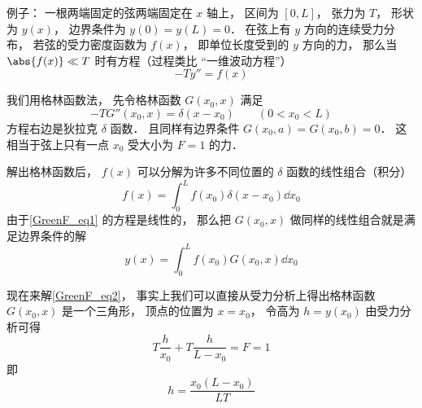 
\begin{issues}
\issueDraft
\end{issues}


例子： 一根两端固定的弦两端固定在 $x$ 轴上， 区间为 $[0, L]$， 张力为 $T$， 形状为 $y(x)$， 边界条件为 $y(0) = y(L) = 0$． 在弦上有 $y$ 方向的连续受力分布， 若弦的受力密度函数为 $f(x)$， 即单位长度受到的 $y$ 方向的力， 那么当 $\abs{f(x)} \ll T$ 时有方程（过程类比 “一维波动方程”）
\begin{equation}\label{GreenF_eq1}
-T y'' = f(x)
\end{equation}

我们用格林函数法， 先令格林函数 $G(x_0, x)$ 满足
\begin{equation}\label{GreenF_eq2}
-T G''(x_0, x) = \delta(x - x_0) \qquad (0 < x_0 < L)
\end{equation}
方程右边是狄拉克 $\delta$ 函数． 且同样有边界条件 $G(x_0, a) = G(x_0, b) = 0$． 这相当于弦上只有一点 $x_0$ 受大小为 $F = 1$ 的力．

解出格林函数后， $f(x)$ 可以分解为许多不同位置的 $\delta$ 函数的线性组合（积分）
\begin{equation}
f(x) = \int_0^L f(x_0) \delta(x - x_0) \dd{x_0}
\end{equation}
由于\autoref{GreenF_eq1} 的方程是线性的， 那么把 $G(x_0, x)$ 做同样的线性组合就是满足边界条件的解
\begin{equation}
y(x) = \int_0^L f(x_0) G(x_0, x) \dd{x_0}
\end{equation}

现在来解\autoref{GreenF_eq2}， 事实上我们可以直接从受力分析上得出格林函数 $G(x_0, x)$ 是一个三角形， 顶点的位置为 $x = x_0$， 令高为 $h = y(x_0)$ 由受力分析可得
\begin{equation}
T\frac{h}{x_0} + T\frac{h}{L - x_0} = F = 1
\end{equation}
即
\begin{equation}
h = \frac{x_0 (L - x_0)}{LT}
\end{equation}

